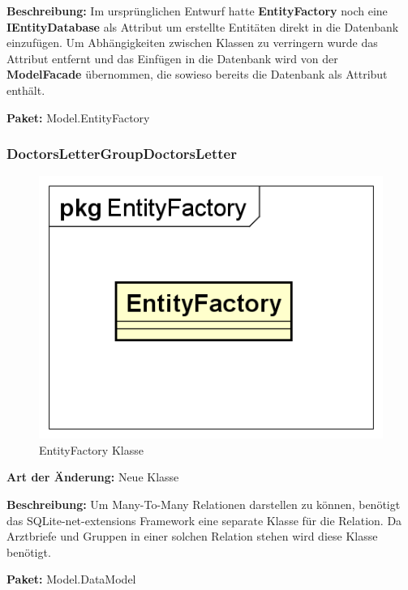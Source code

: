 \documentclass[a4paper]{scrreprt}
\begin{document}
\textbf{Beschreibung:} Im ursprünglichen Entwurf hatte \textbf{EntityFactory} noch eine \textbf{IEntityDatabase} als Attribut um erstellte Entitäten direkt in die Datenbank einzufügen. Um Abhängigkeiten zwischen Klassen zu verringern wurde das Attribut entfernt und das Einfügen in die Datenbank wird von der \textbf{ModelFacade} übernommen, die sowieso bereits die Datenbank als Attribut enthält.

\textbf{Paket:} Model.EntityFactory

\subsubsection{DoctorsLetterGroupDoctorsLetter}
\begin{figure}[H]
\centering
\includegraphics[width=0.45\textheight]{graphics/Klassendiagramme/Model/EntityFactory.png}
\caption{EntityFactory Klasse}
\end{figure}
\textbf{Art der Änderung:} Neue Klasse

\textbf{Beschreibung:} Um Many-To-Many Relationen darstellen zu können, benötigt das SQLite-net-extensions Framework eine separate Klasse für die Relation. Da Arztbriefe und Gruppen in einer solchen Relation stehen wird diese Klasse benötigt.

\textbf{Paket:} Model.DataModel
\end{document}
